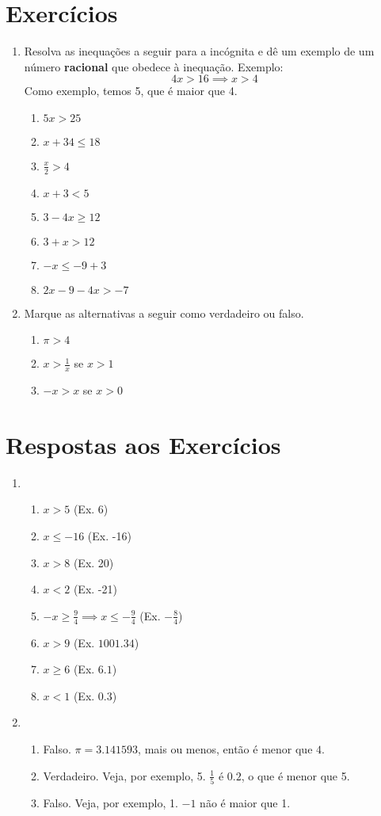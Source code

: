 \documentclass[11pt]{article}
\begin{document}
\section{Exercícios}
\begin{enumerate}
	\item Resolva as inequações a seguir para a incógnita e dê um exemplo de
		  um número \textbf{racional} que obedece à inequação. Exemplo:
		  $$4x > 16 \implies x > 4$$
		  Como exemplo, temos 5, que é maior que 4.
	\begin{enumerate}
		\item $5x > 25$
		\item $x + 34 \leq 18$
		\item $\frac{x}{2} > 4$
		\item $x + 3 < 5$
		\item $3 - 4x \geq 12$
		\item $3 + x > 12$
		\item $-x \leq -9+3$
		\item $2x -9 -4x > -7$
	\end{enumerate}

	\item Marque as alternativas a seguir como verdadeiro ou falso.
	\begin{enumerate}
		\item $\pi > 4$
		\item $x > \frac{1}{x}$ se $x > 1$
		\item $-x > x$ se $x > 0$
	\end{enumerate}
\end{enumerate}

\newpage

\section{Respostas aos Exercícios}
\begin{enumerate}
	\item
	\begin{enumerate}
		\item $x > 5$ (Ex. 6)
		\item $x \leq -16$ (Ex. -16)
		\item $x > 8$ (Ex. 20)
		\item $x < 2$ (Ex. -21)
		\item $-x\geq\frac{9}{4}\implies x\leq-\frac{9}{4}$ (Ex. $-\frac{8}{4}$)
		\item $x > 9$ (Ex. $1001.34$)
		\item $x \geq 6$ (Ex. $6.1$)
		\item $x < 1$ (Ex. $0.3$)
	\end{enumerate}

	\item
	\begin{enumerate}
		\item Falso. $\pi = 3.141593$, mais ou menos, então é menor que $4$.
		\item Verdadeiro. Veja, por exemplo, 5. $\frac{1}{5}$ é $0.2$, o que é
			  menor que 5.
		\item Falso. Veja, por exemplo, 1. $-1$ não é maior que 1.
	\end{enumerate}
\end{enumerate}
\end{document}
